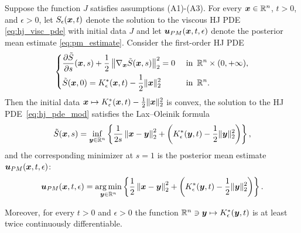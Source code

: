 \begin{prop} \label{thm:char_opt_sol}
Suppose the function $J$ satisfies assumptions (A1)-(A3). For every $\boldsymbol{x} \in \mathbb{R}^n$, $t>0$, and $\epsilon>0$, let $S_\epsilon(\boldsymbol{x},t)$ denote the solution to the viscous HJ PDE \eqref{eq:hj_visc_pde} with initial data $J$ and let $\boldsymbol{u}_{PM}(\boldsymbol{x},t,\epsilon)$ denote the posterior mean estimate \eqref{eq:pm_estimate}. Consider the first-order HJ PDE
\begin{equation} \label{eq:hj_pde_mod}
\begin{dcases}
\frac{\partial\tilde{S}}{\partial s}(\boldsymbol{x},s)+\frac{1}{2}\left\Vert \nabla_{\boldsymbol{x}}\tilde{S}(\boldsymbol{x},s)\right\Vert _{2}^{2}=0 & \textrm{\text{ in }}\,\mathbb{R}^n\times(0,+\infty),\\
\tilde{S}(\boldsymbol{x},0)=K^{*}_{\epsilon}(\boldsymbol{x},t)-\frac{1}{2}\Vert \boldsymbol{x} \Vert_{2}^{2} & \textrm{\text{ in }}\,\mathbb{R}^n.
\end{dcases}
\end{equation}
Then the initial data $\boldsymbol{x} \mapsto K^{*}_{\epsilon}(\boldsymbol{x},t)-\frac{1}{2}\Vert \boldsymbol{x} \Vert_{2}^{2}$ is convex, the solution to the HJ PDE~\eqref{eq:hj_pde_mod} satisfies the Lax--Oleinik formula
\begin{equation*}
\tilde{S}(\boldsymbol{x},s) = \inf_{\boldsymbol{y}\in\mathbb{R}^n}\left\{ \frac{1}{2s}\left\Vert \boldsymbol{x}-\boldsymbol{y}\right\Vert _{2}^{2} + \left(K^{*}_{\epsilon}(\boldsymbol{y},t)-\frac{1}{2}\Vert \boldsymbol{y} \Vert_{2}^{2}\right)\right\},
\end{equation*}
and the corresponding minimizer at $s = 1$ is the posterior mean estimate $\boldsymbol{u}_{PM}(\boldsymbol{x},t,\epsilon)$:
\begin{equation}\label{eq:upm_rep_map_est}
\boldsymbol{u}_{PM}(\boldsymbol{x},t,\epsilon) = \operatorname*{arg\,min}_{\boldsymbol{y}\in\mathbb{R}^n}\left\{ \frac{1}{2}\left\Vert \boldsymbol{x}-\boldsymbol{y}\right\Vert _{2}^{2} + \left(K^{*}_{\epsilon}(\boldsymbol{y},t)-\frac{1}{2}\Vert \boldsymbol{y} \Vert_{2}^{2}\right)\right\}.
\end{equation}
\end{prop}
Moreover, for every $t>0$ and $\epsilon > 0$ the function $\mathbb{R}^n \ni \boldsymbol{y} \mapsto K^{*}_{\epsilon}(\boldsymbol{y},t)$ is at least twice continuously differentiable.

